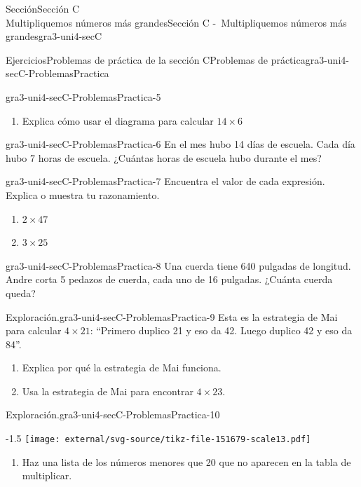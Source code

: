 \begin{sectionptx}{Sección}{{\Large Sección C\\}Multipliquemos números más grandes}{}{Sección C -~Multipliquemos números más grandes}{}{}{gra3-uni4-secC}
\begin{exercises-subsection}{Ejercicios}{Problemas de práctica de la sección C}{}{Problemas de práctica}{}{}{gra3-uni4-secC-ProblemasPractica}
\begin{divisionexercise}{3}{}{}{gra3-uni4-secC-ProblemasPractica-5}
\begin{sidebyside}{2}{0.0125}{0.0125}{0.025}
\begin{sbspanel}{0.6}
\begin{enumerate}[label={(\alph*)}]
\item{}Explica cómo usar el diagrama para calcular \(14 \times 6\)%
\end{enumerate}
\end{sbspanel}%
\end{sidebyside}%
\end{divisionexercise}%
\begin{divisionexercise}{4}{}{}{gra3-uni4-secC-ProblemasPractica-6}%
En el mes hubo 14 días de escuela. Cada día hubo 7 horas de escuela. ¿Cuántas horas de escuela hubo durante el mes?%
\end{divisionexercise}%
\begin{divisionexercise}{5}{}{}{gra3-uni4-secC-ProblemasPractica-7}%
Encuentra el valor de cada expresión. Explica o muestra tu razonamiento.%
%
\begin{enumerate}[label={(\alph*)}]
\item{}\(\displaystyle 2 \times 47\)%
\item{}\(\displaystyle 3 \times 25\)%
\end{enumerate}
\end{divisionexercise}%
\begin{divisionexercise}{6}{}{}{gra3-uni4-secC-ProblemasPractica-8}%
Una cuerda tiene 640 pulgadas de longitud. Andre corta 5 pedazos de cuerda, cada uno de 16 pulgadas. ¿Cuánta cuerda queda?%
\end{divisionexercise}%
\begin{divisionexercise}{7}{Exploración.}{}{gra3-uni4-secC-ProblemasPractica-9}%
Esta es la estrategia de Mai para calcular \(4 \times 21\): “Primero duplico 21 y eso da 42. Luego duplico 42 y eso da 84”.%
%
\begin{enumerate}[label={(\alph*)}]
\item{}Explica por qué la estrategia de Mai funciona.%
\item{}Usa la estrategia de Mai para encontrar \(4 \times 23\).%
\end{enumerate}
\end{divisionexercise}%
\begin{divisionexercise}{8}{Exploración.}{}{gra3-uni4-secC-ProblemasPractica-10}%
\begin{image}{0}{1}{0}{-1.5\baselineskip}%
\texttt{[image: external/svg-source/tikz-file-151679-scale13.pdf]}
\end{image}%
%
\begin{enumerate}[label={(\alph*)}]
\item{}Haz una lista de los números menores que 20 que no aparecen en la tabla de multiplicar.%

\end{enumerate}
\end{divisionexercise}
\end{exercises-subsection}
\end{sectionptx}

